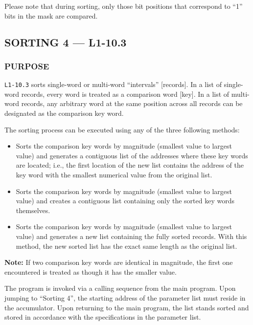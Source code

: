 Please note that during sorting, only those bit positions that correspond to ``1'' bits in the mask are compared.
\pagebreak
\subsection*{SORTING 4 --- L1-10.3}

\subsubsection*{PURPOSE}
\texttt{L1-10.3} sorts single-word or multi-word ``intervals'' [records]. In a list of single-word records, every word is treated as a comparison word [key]. In a list of multi-word records, any arbitrary word at the same position across all records can be designated as the comparison key word.

The sorting process can be executed using any of the three following methods:
\begin{itemize}
    \item[\textbf{Method I:}] Sorts the comparison key words by magnitude (smallest value to largest value) and generates a contiguous list of the addresses where these key words are located; i.e., the first location of the new list contains the address of the key word with the smallest numerical value from the original list.
    \item[\textbf{Method II:}] Sorts the comparison key words by magnitude (smallest value to largest value) and creates a contiguous list containing only the sorted key words themselves.
    \item[\textbf{Method III:}] Sorts the comparison key words by magnitude (smallest value to largest value) and generates a new list containing the fully sorted records. With this method, the new sorted list has the exact same length as the original list.
\end{itemize}

\noindent \textbf{Note:} If two comparison key words are identical in magnitude, the first one encountered is treated as though it has the smaller value.

The program is invoked via a calling sequence from the main program. Upon jumping to ``Sorting 4'', the starting address of the parameter list must reside in the accumulator. Upon returning to the main program, the list stands sorted and stored in accordance with the specifications in the parameter list.

